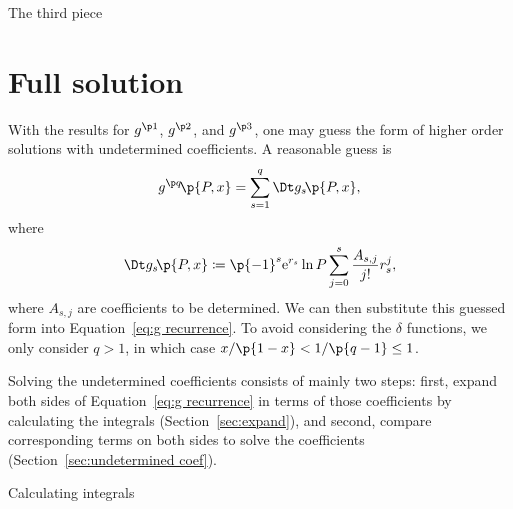 \documentclass[oneside,12pt,final]{ucthesis-CA2012}
\newcommand{\mrm}[1]{\mathrm{#1}}
\newcommand{\dlt}{\delta}
\newcommand{\ceq}{\coloneqq}
\newcommand{\e}{\mrm{e}}
\newcommand{\fr}{\frac}
\newcommand{\fc}[2]{#1\mathchoice{\!}{\!}{}{}\p{#2}} %
\begin{document}
\begin{mainmatter}
\begin{section}{The third piece}
\end{section}
\chapter{Full solution}
\label{sec:gq}

With the results for $g^{\p1}$, $g^{\p2}$, and $g^{\p3}$,
one may guess the form of higher order solutions with undetermined coefficients.
A reasonable guess is
\begin{equation}
	\label{eq:gq guess}
	\fc{g^{\p q}}{P,x}=\sum_{s=1}^q\fc{\Dt g_s}{P,x},
\end{equation}
where
\begin{equation}
	\label{eq:Dgs guess}
	\fc{\Dt g_s}{P,x}\ceq\p{-1}^s\e^{r_s}\ln P\sum_{j=0}^s\fr{A_{s,j}}{j!}r_s^j,
\end{equation}
where $A_{s,j}$ are coefficients to be determined.
We can then substitute this guessed form into Equation~\ref{eq:g recurrence}.
To avoid considering the $\dlt$ functions, we only consider $q>1$,
in which case $x/\p{1-x}<1/\p{q-1}\le1$.

Solving the undetermined coefficients consists of mainly two steps:
first, expand both sides of Equation~\ref{eq:g recurrence} in terms of those coefficients
by calculating the integrals
(Section~\ref{sec:expand}),
and second, compare corresponding terms on both sides to solve the coefficients
(Section~\ref{sec:undetermined coef}).

\begin{section}{Calculating integrals}
\label{sec:expand}


\end{section}
\end{mainmatter}
\end{document}
